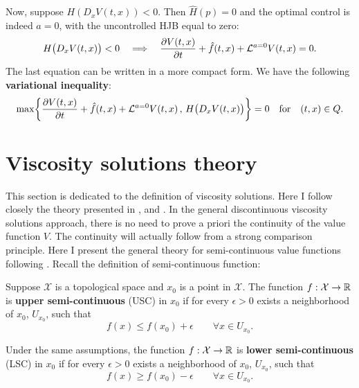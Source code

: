 Now, suppose $H(D_x V(t,x)) < 0$. Then $\hat H(p)=0$ and the optimal control is indeed $a=0$, with the uncontrolled HJB equal to zero:
\begin{equation}
 H\bigl( D_x V(t,x) \bigr) < 0 \quad \Longrightarrow \quad  \frac{\partial V(t,x)}{\partial t} + \hat f(t,x) + \mathcal{L}^{a=0}V(t,x) = 0.
\end{equation}
The last equation can be written in a more compact form. We have the following \textbf{variational inequality}:
\begin{equation}\label{variational_inequality}
 \max \biggl\{ \frac{\partial V(t,x)}{\partial t} + \hat f(t,x) + \mathcal{L}^{a=0}V(t,x) \,,\, H\bigl( D_x V(t,x) \bigr) \biggr \} =0 \quad \mbox{for} \quad (t,x)\in Q. 
\end{equation}







\section{Viscosity solutions theory}


This section is dedicated to the definition of viscosity solutions.
Here I follow closely the theory presented in \cite{Cont}, \cite{Pham} and \cite{BaIm08}.
In the general discontinuous viscosity solutions approach, there is no
need to prove a priori the continuity of the value function $V$. The continuity will actually follow from
a strong comparison principle. Here I present the general theory for semi-continuous value functions following \cite{Cont}.
Recall the definition of semi-continuous function:
\begin{Definition}
 Suppose $\mathcal{X}$ is a topological space and $x_0$ is a point in $\mathcal{X}$.
 The function $f: \mathcal{X} \to \mathbb{R}$ is \textbf{upper semi-continuous} (USC) in $x_0$ if for every $\epsilon > 0$ exists a neighborhood of $x_0$, $U_{x_0}$, such that
 $$ f(x) \leq f(x_0) + \epsilon \quad \quad \forall x \in U_{x_0}. $$
\end{Definition}
\begin{Definition}
 Under the same assumptions,
 the function $f: \mathcal{X} \to \mathbb{R}$ is \textbf{lower semi-continuous} (LSC) in $x_0$ if for every $\epsilon > 0$ exists a neighborhood of $x_0$, $U_{x_0}$, such that
 $$ f(x) \geq f(x_0) - \epsilon \quad \quad \forall x \in U_{x_0}. $$
\end{Definition}



